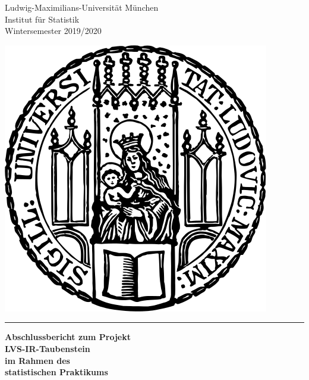 \documentclass[12pt]{scrreprt}
\begin{document}
	
\pagestyle{myheadings}	
	
\begin{titlepage}
		\begin{center}
			\begin{minipage}{0.6\textwidth}%
				\begin{flushleft}
					Ludwig-Maximilians-Universität München\\
					Institut für Statistik \\
					Wintersemester 2019/2020 \\
				\end{flushleft}
			\end{minipage}
			\begin{minipage}{0.35\textwidth}%
				\begin{flushright}
					\includegraphics[scale = 0.2]{plots/lmu_logo}
				\end{flushright}
			\end{minipage}%
		\end{center}
		
		
		
		
		
		
		
		\vspace{3cm}
		
		\hrule
		
		\vspace{1cm}
		
		{\centering
			{	
				\Large\bfseries Abschlussbericht zum Projekt\\
				LVS-IR-Taubenstein \\
				im Rahmen des \\
				statistischen Praktikums\par}
			
}
\end{titlepage}
\end{document}
